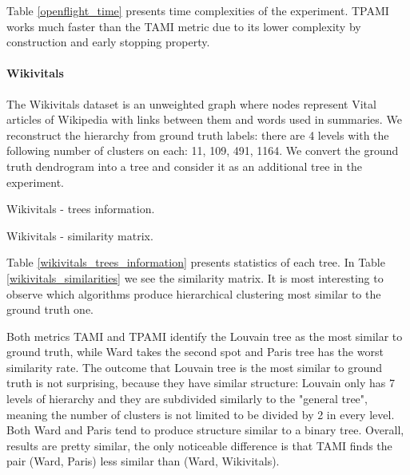 Table \ref{openflight_time} presents time complexities of the experiment. TPAMI works much faster than the TAMI metric due to its lower complexity by construction and early stopping property.

\paragraph{Wikivitals}

The Wikivitals dataset is an unweighted graph where nodes represent Vital articles of Wikipedia with links between them and words used in summaries. We reconstruct the hierarchy from ground truth labels: there are 4 levels with the following number of clusters on each: 11, 109, 491, 1164. We convert the ground truth dendrogram into a tree and consider it  as an additional tree in the experiment. 

\begin{table}[h]
	\centering
	\caption{Wikivitals - trees information. \label{wikivitals_trees_information}}
	
\end{table}

\begin{table}[h]
	\centering
	\caption{Wikivitals - similarity matrix.}
	\label{wikivitals_similarities}
	\subfigure[TAMI.]{
		\centering
		 
	}
	\subfigure[TPAMI.]{
		
	}
\end{table}

Table \ref{wikivitals_trees_information} presents statistics of each tree. In Table \ref{wikivitals_similarities} we see the similarity matrix. It is most interesting to observe which algorithms produce  hierarchical clustering most similar to the ground truth one. 

Both metrics TAMI and TPAMI identify the Louvain tree as the most similar to ground truth, while Ward takes the second spot and Paris tree has the worst similarity rate. The outcome that Louvain tree is the most similar to ground truth is not surprising, because they have similar structure: Louvain only has 7 levels of hierarchy and they are subdivided similarly to the "general tree", meaning the number of clusters is not limited to be divided by 2 in every level. Both Ward and Paris tend to produce structure similar to a binary tree. Overall, results are pretty similar, the only noticeable difference is that TAMI finds the pair (Ward, Paris) less similar than (Ward, Wikivitals).

